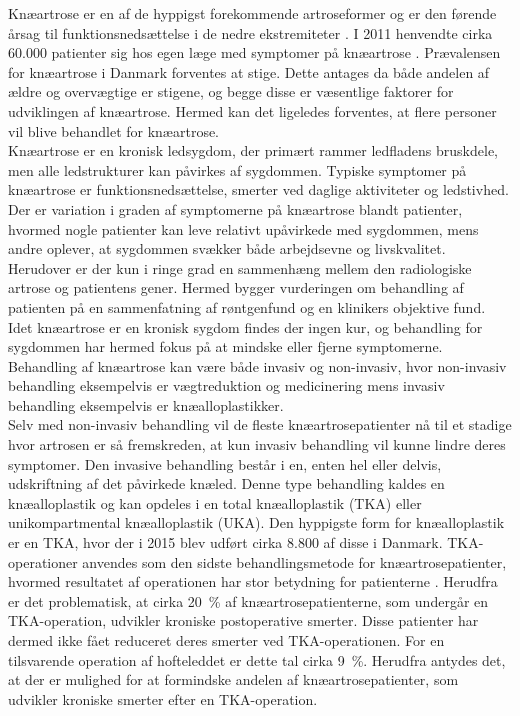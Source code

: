 Knæartrose er en af de hyppigst forekommende artroseformer og er den førende årsag til funktionsnedsættelse i de nedre ekstremiteter \citep{Beswick2012}. I 2011 henvendte cirka 60.000 patienter sig hos egen læge med symptomer på knæartrose \citep{brostrom2012}. Prævalensen for knæartrose i Danmark forventes at stige. Dette antages da både andelen af ældre og overvægtige er stigene, og begge disse er væsentlige faktorer for udviklingen af knæartrose. \citep{sygdom} Hermed kan det ligeledes forventes, at flere personer vil blive behandlet for knæartrose. \\    
Knæartrose er en kronisk ledsygdom, der primært rammer ledfladens bruskdele, men alle ledstrukturer kan påvirkes af sygdommen. \citep{schroder} Typiske symptomer på knæartrose er funktionsnedsættelse, smerter ved daglige aktiviteter og ledstivhed. Der er variation i graden af symptomerne på knæartrose blandt patienter, hvormed nogle patienter kan leve relativt upåvirkede med sygdommen, mens andre oplever, at sygdommen svækker både arbejdsevne og livskvalitet. \citep{sygdom} Herudover er der kun i ringe grad en sammenhæng mellem den radiologiske artrose og patientens gener. Hermed bygger vurderingen om behandling af patienten på en sammenfatning af røntgenfund og en klinikers objektive fund. \citep{ugeskrift2011} Idet knæartrose er en kronisk sygdom findes der ingen kur, og behandling for sygdommen har hermed fokus på at mindske eller fjerne symptomerne. Behandling af knæartrose kan være både invasiv og non-invasiv, hvor non-invasiv behandling eksempelvis er vægtreduktion og medicinering mens invasiv behandling eksempelvis er knæalloplastikker. \\
Selv med non-invasiv behandling vil de fleste knæartrosepatienter nå til et stadige hvor artrosen er så fremskreden, at kun invasiv behandling vil kunne lindre deres symptomer. \citep{brostrom2012} Den invasive behandling består i en, enten hel eller delvis, udskriftning af det påvirkede knæled. Denne type behandling kaldes en knæalloplastik og kan opdeles i en total knæalloplastik (TKA) eller unikompartmental knæalloplastik (UKA). Den hyppigste form for knæalloplastik er en TKA, hvor der i 2015 blev udført cirka 8.800 af disse i Danmark. \citep{aarsrapport2016} TKA-operationer anvendes som den sidste behandlingsmetode for knæartrosepatienter, hvormed resultatet af operationen har stor betydning for patienterne \citep{brostrom2012}. Herudfra er det problematisk, at cirka 20~\% af knæartrosepatienterne, som undergår en TKA-operation, udvikler kroniske postoperative smerter. Disse patienter har dermed ikke fået reduceret deres smerter ved TKA-operationen. For en tilsvarende operation af hofteleddet er dette tal cirka 9~\%. \citep{Beswick2012} Herudfra antydes det, at der er mulighed for at formindske andelen af knæartrosepatienter, som udvikler kroniske smerter efter en TKA-operation.     

